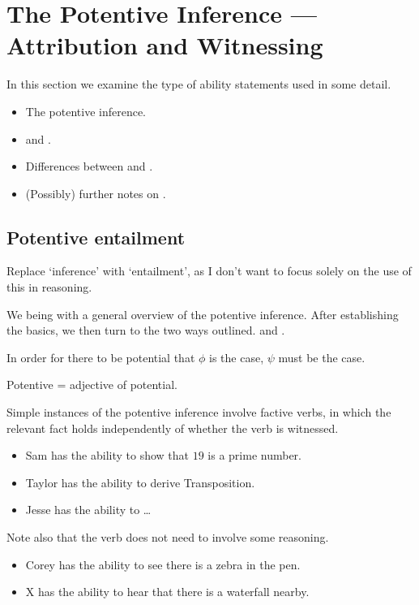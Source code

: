 
\chapter{The Potentive Inference --- Attribution and Witnessing}
\label{cha:potent-infer-attr}

\begin{note}[Overview]
  In this section we examine the type of ability statements used in some detail.

  \begin{itemize}
  \item The potentive inference.
  \item \AR{} and \WR{}.
  \item Differences between \AR{} and \WR{}.
  \item (Possibly) further notes on \WR{}.
  \end{itemize}
\end{note}

\section{Potentive entailment}
\label{sec:potentive-entailment}

{
  \color{red}
  Replace `inference' with `entailment', as I don't want to focus solely on the use of this in reasoning.
}

\begin{note}[Overview]
  We being with a general overview of the potentive inference.
  After establishing the basics, we then turn to the two ways outlined.
  \AR{} and \WR{}.
\end{note}

\begin{note}
  In order for there to be potential that \(\phi\) is the case, \(\psi\) must be the case.

  Potentive = adjective of potential.
\end{note}

\begin{note}[Examples]
  Simple instances of the potentive inference involve factive verbs, in which the relevant fact holds independently of whether the verb is witnessed.
  \begin{itemize}
  \item Sam has the ability to show that \(19\) is a prime number.
  \item Taylor has the ability to derive Transposition.
  \item Jesse has the ability to \dots
  \end{itemize}

  Note also that the verb does not need to involve some reasoning.
  \begin{itemize}
  \item Corey has the ability to see there is a zebra in the pen.
  \item X has the ability to hear that there is a waterfall nearby.
  \end{itemize}
\end{note}

